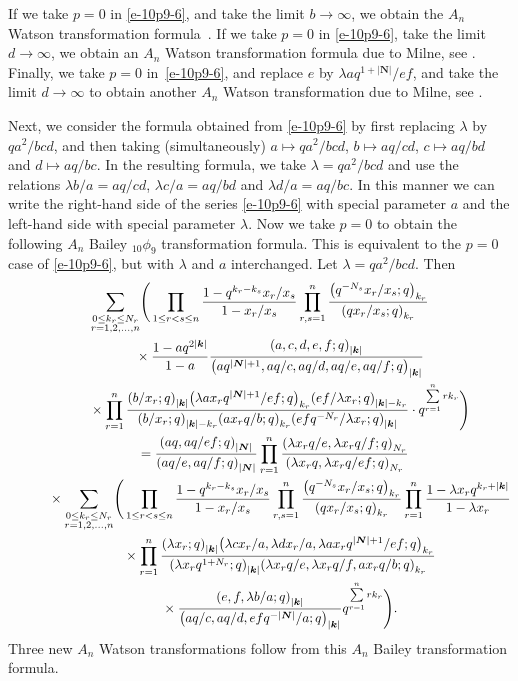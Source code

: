 \documentclass[pdftex]{sigma}
\numberwithin{equation}{section}
\newcommand{\sumN}{{\left| \boldsymbol{N} \right|}}
\newcommand\sumk{{\left| \boldsymbol{k} \right|}}
\newcommand{\multsum}[3]{{\sum\limits_{\substack{{0\le #1_#3 \le #2_#3} \\
{#3 =1,2,\dots, n}}}}}
\newcommand{\qrfac}[2]{{\left({#1}; q\right)_{#2}}} %
\newcommand{\triprod}[1]{\prod\limits_{1\le r < s \le #1}}
\newcommand{\sqprod}[1]{\prod\limits_{r, s =1}^{#1}} %
\newcommand{\smallprod}[1]{\prod\limits_{r =1}^{#1}} %
\newcommand{\xover}[1]{#1_{r}/#1_{s}}
\newcommand{\vandermonde}[3]{\triprod{#3} %
 \frac{1-q^{#2_r-#2_s} \xover {#1} }{1-\xover{#1}}
}
\begin{document}
If we take $p=0$ in \eqref{e-10p9-6}, and take the limit $b\to \infty$, we obtain the $A_n$ Watson transformation formula~\cite[Theorem~4.3]{BS1998}. If we take $p=0$ in \eqref{e-10p9-6}, take the limit $d\to \infty$, we obtain an $A_n$ Watson transformation formula due to Milne, see \cite[Theorem~2.1]{Milne2000}. Finally, we take $p=0$ in~\eqref{e-10p9-6}, and replace $e$ by $\lambda aq^{1+\sumN}/ef$, and take the limit $d\to \infty$ to obtain another $A_n$ Watson transformation due to Milne, see \cite[Theorem~A.3]{MN1996}.

Next, we consider the formula obtained from \eqref{e-10p9-6} by first replacing $\lambda$ by $qa^2/bcd$, and then taking (simultaneously) $a\mapsto qa^2/bcd$, $b\mapsto aq/cd$, $c\mapsto aq/bd$ and $d\mapsto aq/bc$. In the resulting formula, we take $\lambda = qa^2/bcd$ and use the relations $\lambda b/a = aq/cd$, $\lambda c/a = aq/bd$ and $\lambda d/a = aq/bc$. In this manner we can write the right-hand side of the series \eqref{e-10p9-6} with special parameter $a$ and the left-hand side with special parameter $\lambda$. Now we take $p=0$ to obtain the following $A_n$ Bailey $_{10}\phi_9$ transformation formula. This is equivalent to the $p=0$ case of \eqref{e-10p9-6}, but with $\lambda$ and $a$ interchanged.
Let $\lambda = qa^2/bcd$. Then
\begin{gather}
\multsum{k}{N}{r} \Bigg( \vandermonde{x}{k}{n}
\sqprod n \frac{\qrfac{q^{-N_s}\xover{x}}{k_r} }{\qrfac{q\xover{x}}{k_r} } \notag \\
\qquad\quad{} \times \frac{{1-aq^{2\sumk}}}{{1-a}}
\frac{\qrfac{a, c, d, e, f}{\sumk}}{\qrfac{aq^{\sumN+1}, aq/c, aq/d, aq/e, aq/f}{\sumk}} \nonumber\\
\qquad\quad{} \times
\smallprod n \frac{\qrfac{b/x_r}{\sumk}\qrfac{\lambda a x_r q^{\sumN+1}/ef}{k_r}
\qrfac{ef/\lambda x_r}{\sumk-k_r}}{\qrfac{b/x_r}{\sumk-k_r}
\qrfac{ax_rq/b}{k_r}\qrfac{efq^{-N_r}/\lambda x_r}{\sumk}}
\cdot q^{\sum\limits_{r=1}^n rk_r} \Bigg)\notag \\
\qquad{} = \frac{\qrfac{aq, aq/ef}{\sumN}}{\qrfac{aq/e, aq/f}{\sumN}}
\smallprod n \frac{\qrfac{\lambda x_rq/e, \lambda x_r q/f}{N_r}}
{\qrfac{\lambda x_rq, \lambda x_rq/ef}{N_r}}\notag \\
\qquad\quad{} \times \multsum{k}{N}{r} \Bigg(\vandermonde{x}{k}{n}
\sqprod n \frac{\qrfac{q^{-N_s}\xover{x}}{k_r} }{\qrfac{q\xover{x}}{k_r} }
\smallprod n \frac{{1-\lambda x_r q^{k_r+\sumk}}}{{1-\lambda x_r}} \notag \\
\qquad\quad{} \times \smallprod n \frac{\qrfac{\lambda x_r}{\sumk}
\qrfac{\lambda cx_r/a, \lambda dx_r/a, \lambda ax_r q^{\sumN+1}/ef}{k_r}}
 {\qrfac{\lambda x_rq^{1+N_r}}{\sumk}
 \qrfac{\lambda x_rq/e, \lambda x_rq/f, ax_rq/b}{k_r}} \notag\\
\qquad\quad{} \times \frac{\qrfac{ e, f, \lambda b/a}{\sumk}} {\qrfac{aq/c, aq/d, efq^{-\sumN}/a}{\sumk}}
q^{\sum\limits_{r=1}^n rk_r} \Bigg). \label{10p9-7-form2}
\end{gather}
Three new $A_n$ Watson transformations follow from this $A_n$ Bailey transformation formula.
\end{document}
